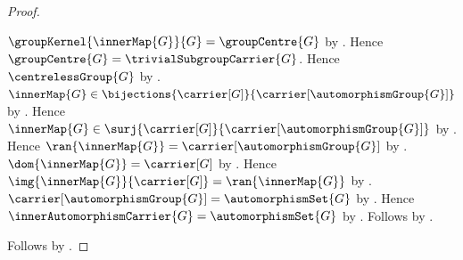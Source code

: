 \begin{proof}
\begin{subproof}
        $\groupKernel{\innerMap{G}}{G}
            =\groupCentre{G}$ by
            .
        Hence $\groupCentre{G}=\trivialSubgroupCarrier{G}$.
        Hence $\centrelessGroup{G}$ by
            .
        $\innerMap{G}\in
            \bijections{\carrier[G]}{
                \carrier[\automorphismGroup{G}]}$ by
            .
        Hence $\innerMap{G}\in
            \surj{\carrier[G]}{\carrier[\automorphismGroup{G}]}$ by
            .
        Hence
            $\ran{\innerMap{G}}=\carrier[\automorphismGroup{G}]$ by
            .
        $\dom{\innerMap{G}}=\carrier[G]$ by
            .
        Hence
            $\img{\innerMap{G}}{\carrier[G]}=
                \ran{\innerMap{G}}$ by
            .
        $\carrier[\automorphismGroup{G}]=\automorphismSet{G}$ by
            .
        Hence
            $\innerAutomorphismCarrier{G}=\automorphismSet{G}$ by
            .
        Follows by .
    \end{subproof}
    Follows by \auto.
\end{proof}
